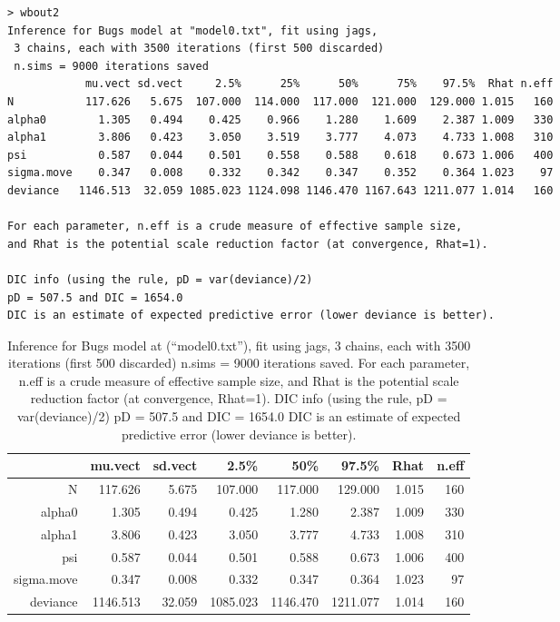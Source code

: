 {\small
\begin{verbatim}
> wbout2
Inference for Bugs model at "model0.txt", fit using jags,
 3 chains, each with 3500 iterations (first 500 discarded)
 n.sims = 9000 iterations saved
            mu.vect sd.vect     2.5%      25%      50%      75%    97.5%  Rhat n.eff
N           117.626   5.675  107.000  114.000  117.000  121.000  129.000 1.015   160
alpha0        1.305   0.494    0.425    0.966    1.280    1.609    2.387 1.009   330
alpha1        3.806   0.423    3.050    3.519    3.777    4.073    4.733 1.008   310
psi           0.587   0.044    0.501    0.558    0.588    0.618    0.673 1.006   400
sigma.move    0.347   0.008    0.332    0.342    0.347    0.352    0.364 1.023    97
deviance   1146.513  32.059 1085.023 1124.098 1146.470 1167.643 1211.077 1.014   160

For each parameter, n.eff is a crude measure of effective sample size,
and Rhat is the potential scale reduction factor (at convergence, Rhat=1).

DIC info (using the rule, pD = var(deviance)/2)
pD = 507.5 and DIC = 1654.0
DIC is an estimate of expected predictive error (lower deviance is better).
\end{verbatim}
}

\begin{table}
\caption{Inference for Bugs model at (``model0.txt''), fit using jags, 3 chains, 
each with 3500 iterations (first 500 discarded) n.sims = 9000 iterations saved. 
For each parameter, n.eff is a crude measure of effective sample size,
and Rhat is the potential scale reduction factor (at convergence, Rhat=1).
DIC info (using the rule, pD = var(deviance)/2)
pD = 507.5 and DIC = 1654.0
DIC is an estimate of expected predictive error (lower deviance is better).
}
\begin{tabular}{rrrrrrrr} \hline \hline
           &  mu.vect & sd.vect &   2.5\%   &     50\%   &   97.5\% &   Rhat &  n.eff \\ \hline
N          &  117.626 &  5.675  &  107.000  &   117.000  &  129.000 &  1.015 &  160 \\
alpha0     &    1.305 &  0.494  &    0.425  &     1.280  &    2.387 &  1.009 &  330 \\ 
alpha1     &    3.806 &  0.423  &    3.050  &     3.777  &    4.733 &  1.008 &  310 \\
psi        &    0.587 &  0.044  &    0.501  &     0.588  &    0.673 &  1.006 &  400 \\
sigma.move &    0.347 &  0.008  &    0.332  &     0.347  &    0.364 &  1.023 &   97 \\
deviance   & 1146.513 &  32.059 & 1085.023  &  1146.470  & 1211.077 &  1.014 &  160 \\ \hline
\end{tabular}
\label{outputtable} 
\end{table}


